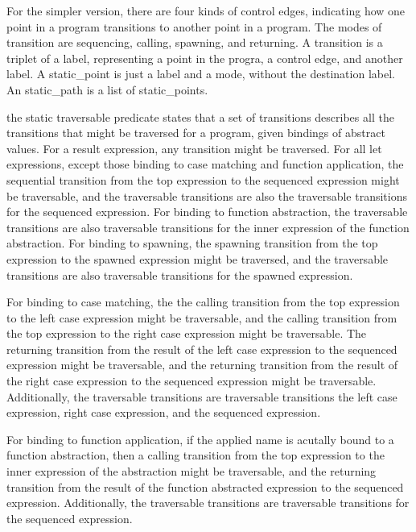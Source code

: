 \documentclass{article}
\begin{document}
For the simpler version, there are four kinds of control edges, indicating how one point in a
program transitions to another point in a program.  The modes of transition are sequencing,
calling, spawning, and returning. A transition is a triplet of a label, representing a point in
the progra, a control edge, and another label.  A static\_point is just a label and a mode,
without the destination label.  An static\_path is a list of static\_points.  

the static traversable predicate states that a set of transitions describes all the transitions
that might be traversed for a program, given bindings of abstract values.  For a result
expression, any transition might be traversed.  For all let expressions, except those binding
to case matching and function application, the sequential transition from the top expression to
the sequenced expression might be traversable, and the traversable transitions are also the
traversable transitions for the sequenced expression.  For binding to function abstraction, the
traversable transitions are also traversable transitions for the inner expression of the
function abstraction.  For binding to spawning, the spawning transition from the top expression
to the spawned expression might be traversed, and the traversable transitions are also
traversable transitions for the spawned expression.

For binding to case matching, the the calling transition from the top expression to the left
case expression might be traversable, and the calling transition from the top expression to the
right case expression might be traversable.  The returning transition from the result of the
left case expression to the sequenced expression might be traversable, and the returning
transition from the result of the right case expression to the sequenced expression might be
traversable.  Additionally, the traversable transitions are traversable transitions the left
case expression, right case expression, and the sequenced expression.   

For binding to function application, if the applied name is acutally bound to a function
abstraction, then a calling transition from the top expression to the inner expression of the
abstraction might be traversable, and the returning transition from the result of the function
abstracted expression to the sequenced expression.  Additionally, the traversable transitions
are traversable transitions for the sequenced expression. 
\end{document}
